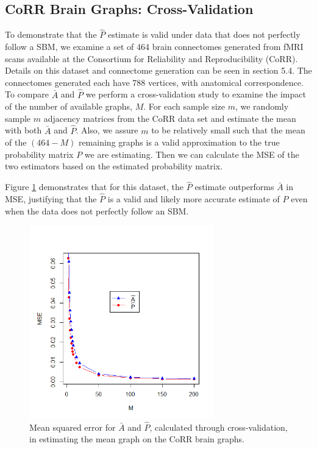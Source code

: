 \subsection{CoRR Brain Graphs: Cross-Validation }
	
	To demonstrate that the $\hat{P}$ estimate is valid under data that does not perfectly follow a SBM, we examine a set of 464 brain connectomes generated from fMRI scans available at the Consortium for Reliability and Reproducibility (CoRR).  Details on this dataset and connectome generation can be seen in section 5.4.  The connectomes generated each have 788 vertices, with anatomical correspondence. To compare $\bar{A}$ and $\hat{P}$ we perform a cross-validation study to examine the impact of the number of available graphs, $M$.  For each sample size $m$, we randomly sample $m$ adjacency matrices from the CoRR data set and estimate the mean with both $\bar{A}$ and $\hat{P}$.  Also, we assure $m$ to be relatively small such that the mean of the $(464 - M)$ remaining graphs is a valid approximation to the true probability matrix $P$ we are estimating. Then we can calculate the MSE of the two estimators based on the estimated probability matrix.
	



Figure \ref{fig:MSEcorr} demonstrates that for this dataset, the $\hat{P}$ estimate outperforms $\bar{A}$ in MSE, justifying that the $\hat{P}$ is a valid and likely more accurate estimate of $P$ even when the data does not perfectly follow an SBM.
	
\begin{figure}[!htb]
		\centering
		\includegraphics[width=8cm]{Corr_XV_3.PNG}
		\caption{Mean squared error for $\bar{A}$ and $\hat{P}$, calculated through cross-validation, in estimating the mean graph on the CoRR brain graphs. }
		\label{fig:MSEcorr}
\end{figure}
\newpage

